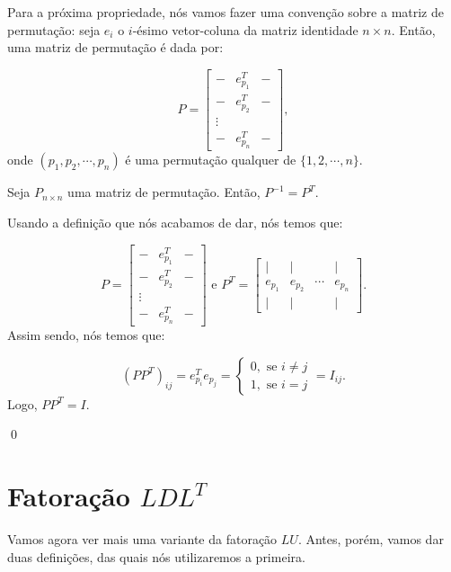 Para a próxima propriedade, nós vamos fazer uma convenção sobre a matriz de permutação: seja $e_i$ o $i$-ésimo vetor-coluna da matriz identidade $n\times n$. Então, uma matriz de permutação é dada por:

$$
P = \begin{bmatrix}
	- & e_{p_1}^T & - \\
	- & e_{p_2}^T & - \\
	\vdots \\
	- & e_{p_n}^T & -
\end{bmatrix},
$$
onde $(p_1, p_2, \cdots, p_n)$ é uma permutação qualquer de $\{1, 2, \cdots, n\}$.

\begin{Proposition}
	Seja $P_{n\times n}$ uma matriz de permutação. Então, $P^{-1} = P^T$.
\end{Proposition}

\begin{Proof}
	Usando a definição que nós acabamos de dar, nós temos que:
	
	$$
	P = \begin{bmatrix}
		- & e_{p_1}^T & - \\
		- & e_{p_2}^T & - \\
		\vdots \\
		- & e_{p_n}^T & -
	\end{bmatrix} \text{ e } P^T = \begin{bmatrix}
		| & | & & | \\
		e_{p_1} & e_{p_2} & \cdots & e_{p_n} \\
		| & | & & |
	\end{bmatrix}.
	$$
	Assim sendo, nós temos que:
	
	$$
	(PP^T)_{ij} = e_{p_i}^Te_{p_j} = \begin{cases}
		0, \text{ se $i\neq j$} \\
		1, \text{ se $i = j$}
	\end{cases} = I_{ij}.
	$$
	Logo, $PP^T = I$.
	
	\qed
\end{Proof}

\section{Fatoração \texorpdfstring{$LDL^T$}{LDL^T}}

Vamos agora ver mais uma variante da fatoração $LU$. Antes, porém, vamos dar duas definições, das quais nós utilizaremos a primeira.

